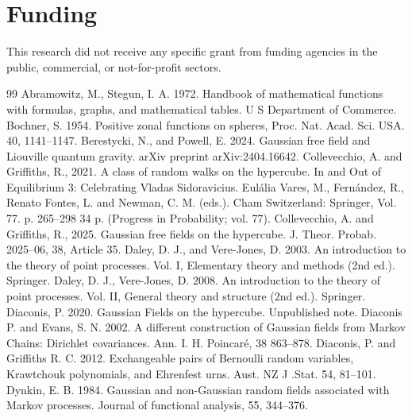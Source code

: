 \documentclass[preprint,11pt]{elsarticle}
\theoremstyle{remark}
\begin{document}
{\section{Funding}
This research did not receive any specific grant from funding agencies in the public, commercial, or not-for-profit sectors.
%
\begin{thebibliography}{99}
Abramowitz, M., Stegun, I. A. 1972. Handbook of mathematical functions with formulas, graphs, and mathematical tables. U S Department of Commerce.
%
Bochner, S. 1954.
Positive zonal functions on spheres, Proc. Nat. Acad. Sci. USA. 40,  1141--1147.
%
 Berestycki, N., and Powell, E. 2024. Gaussian free field and Liouville quantum gravity. arXiv preprint arXiv:2404.16642.
%
Collevecchio, A. and Griffiths, R., 2021. A class of random walks on the hypercube.  In and Out of Equilibrium 3: Celebrating Vladas Sidoravicius. Eulália Vares, M., Fernández, R., Renato Fontes, L. and Newman, C. M. (eds.). Cham Switzerland: Springer, Vol. 77. p. 265--298 34 p. (Progress in Probability; vol. 77). 
%
Collevecchio, A. and Griffiths, R., 2025. Gaussian free fields on the hypercube.
J. Theor. Probab. 2025--06, 38, Article 35.
%
Daley, D. J., and Vere-Jones, D. 2003. An introduction to the theory of point processes. Vol. I, Elementary theory and methods (2nd ed.). Springer.
%
 Daley, D. J.,  Vere-Jones, D. 2008. An introduction to the theory of point processes. Vol. II, General theory and structure (2nd ed.). Springer.
%
 Diaconis, P. 2020.  Gaussian Fields on the hypercube.  Unpublished note. 
%
 Diaconis P. and Evans, S. N. 2002. A different construction of Gaussian fields from Markov Chains: Dirichlet covariances.
Ann. I. H. Poincar{\'e}, 38 863--878.
Diaconis, P. and Griffiths R. C. 2012. Exchangeable pairs of Bernoulli random variables, Krawtchouk polynomials, and Ehrenfest urns. Aust. NZ J .Stat. 54, 81--101.
%
Dynkin, E. B. 1984. Gaussian and non-Gaussian random fields associated with Markov processes. Journal of functional analysis, 55, 344--376. 


\end{thebibliography}}
\end{document}

